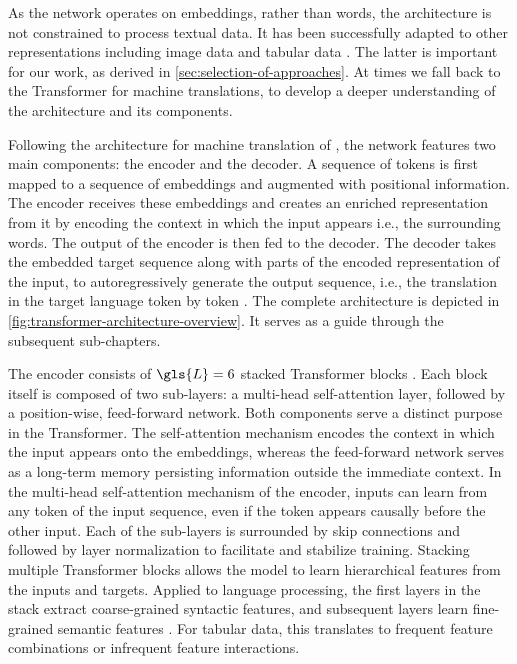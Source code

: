 As the network operates on \glspl{embedding}, rather than words, the architecture is not constrained to process textual data. It has been successfully adapted to other representations including image data \autocites[][2--5]{parmarImageTransformer2018}[][3]{dosovitskiyImageWorth16x162021} and tabular data \autocite[cp.][18932]{gorishniyRevisitingDeepLearning2021}. The latter is important for our work, as derived in \cref{sec:selection-of-approaches}. At times we fall back to the Transformer for machine translations, to develop a deeper understanding of the architecture and its components.

Following the architecture for machine translation of \textcite[][3]{sutskeverSequenceSequenceLearning2014}, the network features two main components: the encoder and the decoder. A sequence of \glspl{token} is first mapped to a sequence of \glspl{embedding} and augmented with positional information. The encoder receives these \glspl{embedding} and creates an enriched representation from it by encoding the context in which the input appears i.e., the surrounding words. The output of the encoder is then fed to the decoder. The decoder takes the embedded target sequence along with parts of the encoded representation of the input, to autoregressively generate the output sequence, i.e., the translation in the target language \gls{token} by \gls{token} \autocite[][3]{vaswaniAttentionAllYou2017}. The complete architecture is depicted in \cref{fig:transformer-architecture-overview}. It serves as a guide through the subsequent sub-chapters.

The encoder consists of $\gls{L}=6$ stacked Transformer blocks \autocite[][6]{vaswaniAttentionAllYou2017}. Each block itself is composed of two sub-layers: a multi-head self-attention layer, followed by a position-wise, feed-forward network. Both components serve a distinct purpose in the Transformer. The self-attention mechanism encodes the context in which the input appears onto the \glspl{embedding}, whereas the feed-forward network serves as a long-term memory persisting information outside the immediate context. In the multi-head self-attention mechanism of the encoder, inputs can learn from any \gls{token} of the input sequence, even if the \gls{token} appears causally before the other input. Each of the sub-layers is surrounded by skip connections \autocite[][2]{heDeepResidualLearning2015} and followed by layer normalization \autocite[][4]{baLayerNormalization2016} to facilitate and stabilize training. Stacking multiple Transformer blocks allows the model to learn hierarchical features from the inputs and targets. Applied to language processing, the first layers in the stack extract coarse-grained syntactic features, and subsequent layers learn fine-grained semantic features \autocites[][3651]{jawaharWhatDoesBERT2019}[][4596]{tenneyBERTRediscoversClassical2019}. For tabular data, this translates to frequent feature combinations or infrequent feature interactions.

